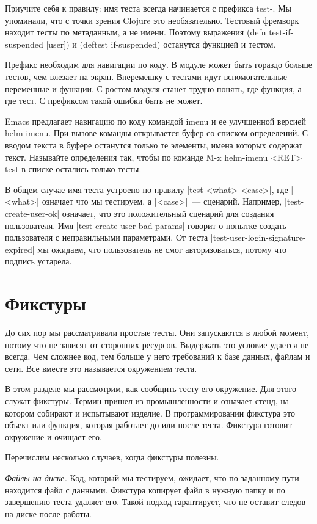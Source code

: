 Приучите себя к правилу: имя теста всегда начинается с префикса test-. Мы
упоминали, что с точки зрения Clojure это необязательно. Тестовый фремворк
находит тесты по метаданным, а не имени. Поэтому выражения (defn
test-if-suspended [user]) и (deftest if-suspended) останутся функцией и тестом.

Префикс необходим для навигации по коду. В модуле может быть гораздо больше
тестов, чем влезает на экран. Вперемешку с тестами идут вспомогательные
переменные и функции. С ростом модуля станет трудно понять, где функция, а где
тест. С префиксом такой ошибки быть не может.

Emacs предлагает навигацию по коду командой imenu и ее улучшенной версией
helm-imenu. При вызове команды открывается буфер со списком определений. С
вводом текста в буфере останутся только те элементы, имена которых содержат
текст. Называйте определения так, чтобы по команде M-x helm-imenu <RET> test в
списке остались только тесты.

В общем случае имя теста устроено по правилу \spverb|test-<what>-<case>|, где \spverb|<what>|
означает что мы тестируем, а \spverb|<case>|~--- сценарий. Например,
\spverb|test-create-user-ok| означает, что это положительный сценарий для создания
пользователя. Имя \spverb|test-create-user-bad-params| говорит о попытке создать
пользователя с неправильными параметрами. От теста
\spverb|test-user-login-signature-expired| мы ожидаем, что пользователь не смог
авторизоваться, потому что подпись устарела.

\section{Фикстуры}

До сих пор мы рассматривали простые тесты. Они запускаются в любой момент,
потому что не зависят от сторонних ресурсов. Выдержать это условие удается не
всегда. Чем сложнее код, тем больше у него требований к базе данных, файлам и
сети. Все вместе это называется окружением теста.

В этом разделе мы рассмотрим, как сообщить тесту его окружение. Для этого служат
фикстуры. Термин пришел из промышленности и означает стенд, на котором собирают
и испытывают изделие. В программировании фикстура это объект или функция,
которая работает до или после теста. Фикстура готовит окружение и очищает его.

Перечислим несколько случаев, когда фикстуры полезны.

\emph{Файлы на диске.} Код, который мы тестируем, ожидает, что по заданному пути
находится файл с данными. Фикстура копирует файл в нужную папку и по завершению
теста удаляет его. Такой подход гарантирует, что не оставит следов на диске
после работы.

